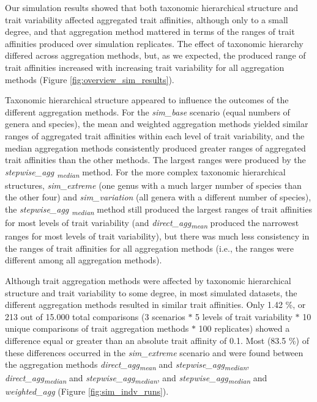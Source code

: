 \documentclass{article}
\begin{document}
Our simulation results showed that both taxonomic hierarchical structure and trait variability affected aggregated trait affinities, although only to a small degree, and that aggregation method mattered in terms of the ranges of trait affinities produced over simulation replicates. The effect of taxonomic hierarchy differed across aggregation methods, but, as we expected, the produced range of trait affinities increased with increasing trait variability for all aggregation methods (Figure \ref{fig:overview_sim_results}). %

Taxonomic hierarchical structure appeared to influence the outcomes of the different aggregation methods. For the \textit{sim\_base} scenario (equal numbers of genera and species), the mean and weighted aggregation methods yielded similar ranges of aggregated trait affinities within each level of trait variability, and the median aggregation methods consistently produced greater ranges of aggregated trait affinities than the other methods. The largest ranges were produced by the \textit{stepwise\_agg \textsubscript{median}} method. For the more complex taxonomic hierarchical structures, \textit{sim\_extreme} (one genus with a much larger number of species than the other four) and \textit{sim\_variation} (all genera with a different number of species), the \textit{stepwise\_agg \textsubscript{median}} method still produced the largest ranges of trait affinities for most levels of trait variability (and \textit{direct\_agg\textsubscript{mean}} produced the narrowest ranges for most levels of trait variability), but there was much less consistency in the ranges of trait affinities for all aggregation methods (i.e., the ranges were different among all aggregation methods).

Although trait aggregation methods were affected by taxonomic hierarchical structure and trait variability to some degree, in most simulated datasets, the different aggregation methods resulted in similar trait affinities. Only 1.42 \%, or 213 out of 15.000 total comparisons (3 scenarios $*$ 5 levels of trait variability $*$ 10 unique comparisons of trait aggregation methods $*$ 100 replicates) showed a difference equal or greater than an absolute trait affinity of 0.1. Most  (83.5 \%) of these differences occurred in the \textit{sim\_extreme} scenario and were found between the aggregation methods \textit{direct\_agg\textsubscript{mean}} and \textit{stepwise\_agg\textsubscript{median}}, \textit{direct\_agg\textsubscript{median}} and \textit{stepwise\_agg\textsubscript{median}}, and \textit{stepwise\_agg\textsubscript{median}} and \textit{weighted\_agg} (Figure \ref{fig:sim_indv_runs}). 
\end{document}
